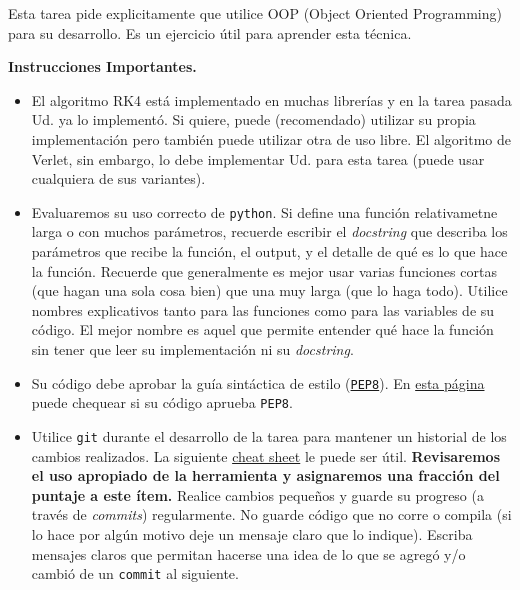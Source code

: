 \documentclass[letter, 11pt]{article}
\begin{document}
\begin{ayuda}
  \small
  Esta tarea pide explicitamente que utilice OOP (Object Oriented Programming)
  para su desarrollo. Es un ejercicio útil para aprender esta técnica.
\end{ayuda}

\vspace{1em}
\noindent\textbf{Instrucciones Importantes.}
\begin{itemize}

\item El algoritmo RK4 está implementado en muchas librerías y en la tarea
  pasada Ud. ya lo implementó. Si quiere, puede (recomendado) utilizar su
  propia implementación pero también puede utilizar otra de uso libre. El
  algoritmo de Verlet, sin embargo, lo debe implementar Ud. para esta tarea
  (puede usar cualquiera de sus variantes).

\item Evaluaremos su uso correcto de \texttt{python}. Si define una función
  relativametne larga o con muchos parámetros, recuerde escribir el
  \emph{docstring} que describa los parámetros que recibe la función, el
  output, y el detalle de qué es lo que hace la función. Recuerde que
  generalmente es mejor usar varias funciones cortas (que hagan una sola cosa
  bien) que una muy larga (que lo haga todo).  Utilice nombres explicativos
  tanto para las funciones como para las variables de su código. El mejor
  nombre es aquel que permite entender qué hace la función sin tener que leer
  su implementación ni su \emph{docstring}.

\item Su código debe aprobar la guía sintáctica de estilo
  (\href{https://www.python.org/dev/peps/pep-0008/}{\texttt{PEP8}}). En
  \href{http://pep8online.com}{esta página} puede chequear si su código aprueba
  \texttt{PEP8}.

\item Utilice \texttt{git} durante el desarrollo de la tarea para mantener un
  historial de los cambios realizados. La siguiente
  \href{https://education.github.com/git-cheat-sheet-education.pdf}{cheat
    sheet} le puede ser útil. {\bf Revisaremos el uso apropiado de la
  herramienta y asignaremos una fracción del puntaje a este ítem.} Realice
  cambios pequeños y guarde su progreso (a través de \emph{commits})
  regularmente. No guarde código que no corre o compila (si lo hace por algún
  motivo deje un mensaje claro que lo indique). Escriba mensajes claros que
  permitan hacerse una idea de lo que se agregó y/o cambió de un
  \texttt{commit} al siguiente.


\end{itemize}
\end{document}
